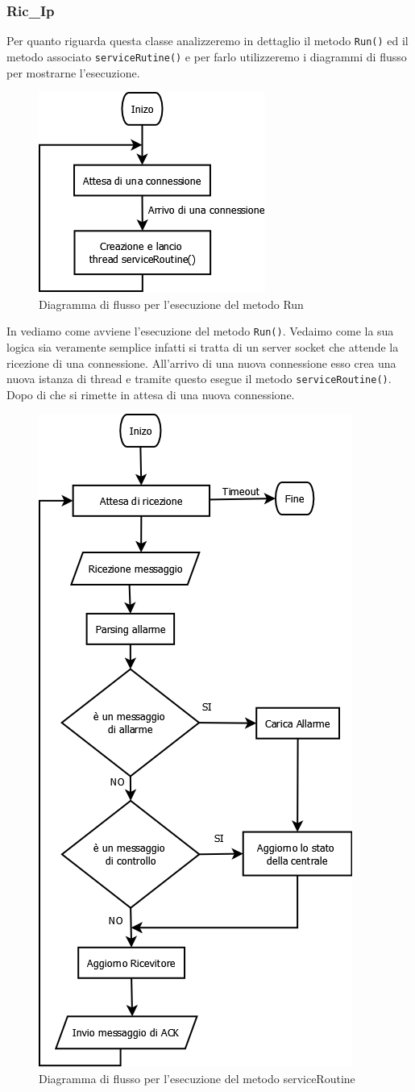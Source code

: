 \subsubsection{Ric\_Ip}
Per quanto riguarda questa classe analizzeremo in dettaglio il metodo \texttt{Run()} ed il metodo associato \texttt{serviceRutine()} e per farlo utilizzeremo i diagrammi di flusso per mostrarne l'esecuzione.
\begin{figure}
	\centering
	\includegraphics[width=0.5\linewidth]{pictures/runricip.png}
	\caption{Diagramma di flusso per l'esecuzione del metodo Run}\label{fig:riciprun}
\end{figure}
In  vediamo come avviene l'esecuzione del metodo \texttt{Run()}. Vedaimo come la sua logica sia veramente semplice infatti si tratta di un server socket che attende la ricezione di una connessione. All'arrivo di una nuova connessione esso crea una nuova istanza di thread e tramite questo esegue il metodo \texttt{serviceRoutine()}. Dopo di che si rimette in attesa di una nuova connessione.
\begin{figure}
	\centering
	\includegraphics[width=0.5\linewidth]{pictures/servicericip.png}
	\caption{Diagramma di flusso per l'esecuzione del metodo serviceRoutine}\label{fig:servicericip}
\end{figure}
